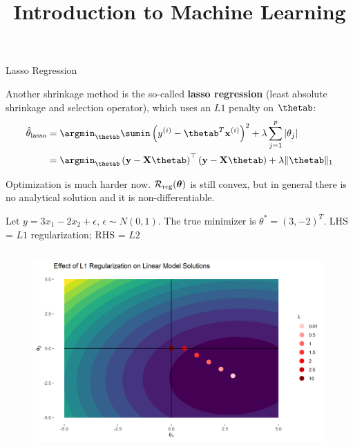 \documentclass[11pt,compress,t,notes=noshow, xcolor=table]{beamer}
\title{Introduction to Machine Learning}
\begin{document}



\begin{vbframe}{Lasso Regression}

Another shrinkage method is the so-called \textbf{lasso regression} ({\scriptsize{least absolute shrinkage and selection operator}}), which uses an $L1$ penalty on $\thetab$:
\vspace{0.4cm}
\begin{align*}
\thetah_{\text{lasso}}&= \argmin_{\thetab} \sumin \left(\yi - \thetab^T \xi\right)^2 + \lambda \sum_{j=1}^{p} \vert\theta_j\vert\\
&= \argmin_{\thetab}\left(\yv - \Xmat \thetab\right)^\top \left(\yv - \Xmat \thetab\right) + \lambda \|\thetab\|_1
\end{align*}

\vspace{0.4cm}

Optimization is much harder now. $\mathcal{R}_{\text{reg}}(\bm{\theta})$ is still convex, but in general there is no analytical solution and it is non-differentiable.\\
\vspace{0.2cm}


\framebreak

Let $y=3x_{1} -2x_{2} +\epsilon $, $ \epsilon \sim N( 0,1)$. The true minimizer is $\theta ^{*} =( 3,-2)^{T}$. 
LHS = $L1$ regularization; RHS = $L2$
\begin{columns}
\begin{column}{0.5\textwidth}
\lz
\begin{figure}
\includegraphics[width=0.99\textwidth]{figure/lin_model_regu_01.png}
\end{figure}
\end{column}


\end{columns}
\end{vbframe}
\end{document}
